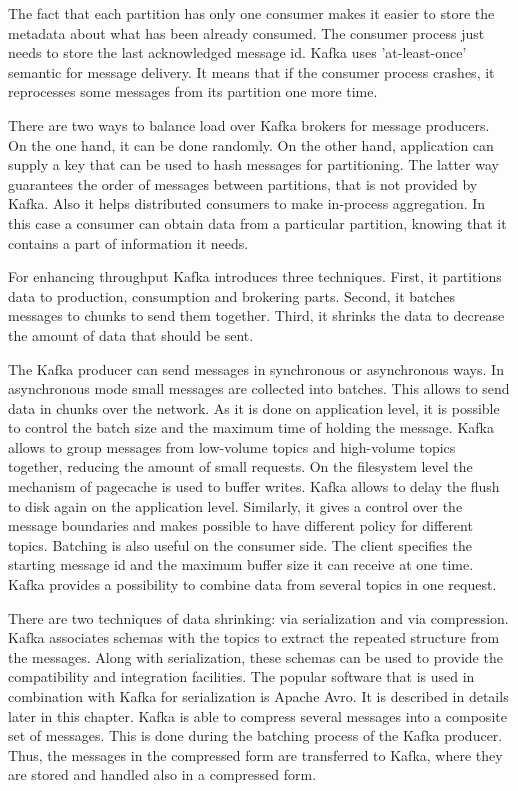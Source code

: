 The fact that each partition has only one consumer makes it easier to store the metadata about what has been already consumed.
The consumer process just needs to store the last acknowledged message id.
Kafka uses 'at-least-once' semantic for message delivery.
It means that if the consumer process crashes, it reprocesses some messages from its partition one more time. 

There are two ways to balance load over Kafka brokers for message producers.
On the one hand, it can be done randomly.
On the other hand, application can supply a key that can be used to hash messages for partitioning.
The latter way guarantees the order of messages between partitions, that is not provided by Kafka.
Also it helps distributed consumers to make in-process aggregation.
In this case a consumer can obtain data from a particular partition, knowing that it contains a part of information it needs.  

For enhancing throughput Kafka introduces three techniques. 
First, it partitions data to production, consumption and brokering parts.
Second, it batches messages to chunks to send them together.
Third, it shrinks the data to decrease the amount of data that should be sent.

The Kafka producer can send messages in synchronous or asynchronous ways.
In asynchronous mode small messages are collected into batches.
This allows to send data in chunks over the network. 
As it is done on application level, it is possible to control the batch size and the maximum time of holding the message.
Kafka allows to group messages from low-volume topics and high-volume topics together, reducing the amount of small requests.
On the filesystem level the mechanism of pagecache is used to buffer writes.
Kafka allows to delay the flush to disk again on the application level.
Similarly, it gives a control over the message boundaries and makes possible to have different policy for different topics.
Batching is also useful on the consumer side.
The client specifies the starting message id and the maximum buffer size it can receive at one time.
Kafka provides a possibility to combine data from several topics in one request.

There are two techniques of data shrinking: via serialization and via compression.
Kafka associates schemas with the topics to extract the repeated structure from the messages.
Along with serialization, these schemas can be used to provide the compatibility and integration facilities.
The popular software that is used in combination with Kafka for serialization is Apache Avro.
It is described in details later in this chapter.
Kafka is able to compress several messages into a composite set of messages.
This is done during the batching process of the Kafka producer.
Thus, the messages in the compressed form are transferred to Kafka, where they are stored and handled also in a compressed form. 

